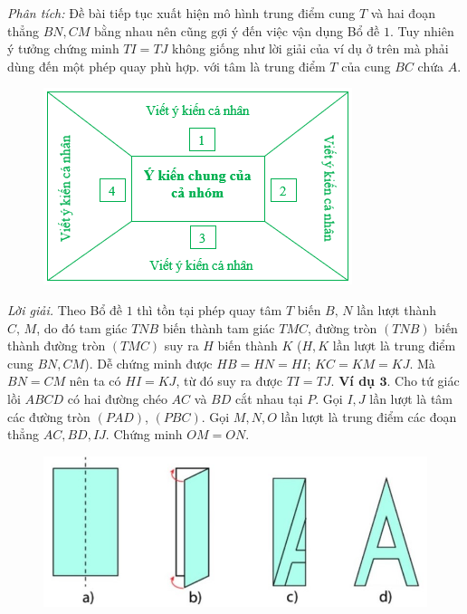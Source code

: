 \begin{multicols}{2}
	\vskip 0.1cm
	\textit{Phân tích:} Đề bài tiếp tục xuất hiện mô hình trung điểm cung $T$ và hai đoạn thẳng $BN,CM$ bằng nhau nên cũng gợi ý đến việc vận dụng Bổ đề $1$. Tuy nhiên ý tưởng chứng minh $TI=TJ$ không giống như lời giải của ví dụ ở trên mà phải dùng đến một phép quay phù hợp. với tâm là trung điểm $T$ của cung $BC$ chứa $A$.
	\begin{figure}[H]
		\vspace*{-5pt}
		\centering
		\captionsetup{labelformat= empty, justification=centering}
		\includegraphics[width= 1\linewidth]{5}
		\vspace*{-10pt}
	\end{figure}
	\textit{Lời giải.} Theo Bổ đề $1$ thì tồn tại phép quay tâm $T$ biến $B,\,N$ lần lượt thành $C,\,M$, do đó tam giác $TNB$ biến thành tam giác $TMC$, đường tròn $(TNB)$ biến thành đường tròn $(TMC)$ suy ra $H$ biến thành $K$ ($H, K$ lần lượt là trung điểm cung $BN,CM$). Dễ chứng minh được $HB=HN=HI$; $KC=KM=KJ$. Mà $BN=CM$ nên ta có $HI=KJ$, từ đó suy ra được $TI=TJ$.
	\vskip 0.1cm
	\textbf{\color{diendantoanhoc}Ví dụ $\pmb{3.}$} Cho tứ giác lồi $ABCD$ có hai đường chéo $AC$ và $BD$ cắt nhau tại $P$. Gọi $I,J$ lần lượt là tâm các đường tròn $(PAD)$, $(PBC)$. Gọi $M,N,O$ lần lượt là trung điểm các đoạn thẳng $AC,BD,IJ$. Chứng minh $OM=ON$.
	\begin{figure}[H]
		\vspace*{-5pt}
		\centering
		\captionsetup{labelformat= empty, justification=centering}
		\includegraphics[width= 1\linewidth]{6}

\end{figure}
\end{multicols}
